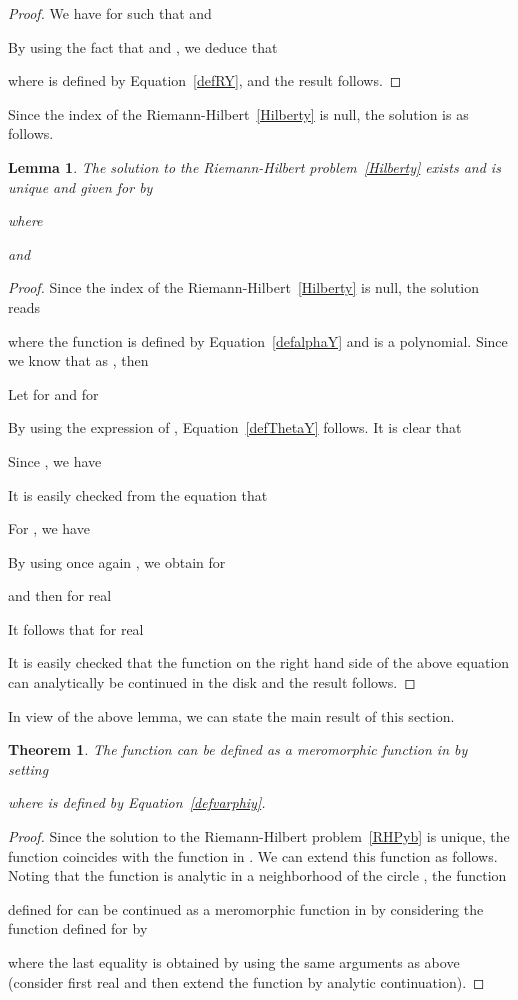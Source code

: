 \documentclass{amsart}
\newtheorem{lemma}{Lemma}[proposition]
\newtheorem{theorem}{Theorem}
\begin{document}
\begin{proof}
We have for  such that  and 

By using the fact that  and , we deduce that 

where  is defined by Equation~\eqref{defRY}, and the result follows.
\end{proof}

Since the index of the Riemann-Hilbert~\eqref{Hilberty} is null, the solution is as follows.

\begin{lemma}
\label{lemHilbert}
The solution to the Riemann-Hilbert problem~\eqref{Hilberty} exists and is unique and given for  by

where

and

\end{lemma}

\begin{proof}
Since the index of the Riemann-Hilbert~\eqref{Hilberty} is null, the solution reads \cite{Lions}

where the function  is defined by Equation~\eqref{defalphaY} and  is a polynomial. Since we know that  as , then


Let for  and  for 

By using the expression of , Equation~\eqref{defThetaY} follows. It is clear that 



Since , we have

It is easily checked from the equation  that

For , we have

By using once again , we obtain for 

and then for real 

It follows that for real 

It is easily checked that the function on the right hand side of the above equation can analytically be continued in the disk  and the result follows. \end{proof}

In view of the above lemma, we can state the main result of this section.

\begin{theorem}
The function  can be defined as a meromorphic function in  by setting 

where  is defined by Equation~\eqref{defvarphiy}.
\end{theorem}

\begin{proof}Since the solution to the Riemann-Hilbert problem~\eqref{RHPyb} is unique, the function  coincides with the function  in . We can extend this function as follows. Noting that the function  is analytic in a neighborhood of the circle , the function 

defined for  can be continued as a meromorphic function in  by considering the function defined for  by

where the last equality is obtained by using the same arguments as above (consider first real  and then extend the function by analytic continuation).
\end{proof}
\end{document}
